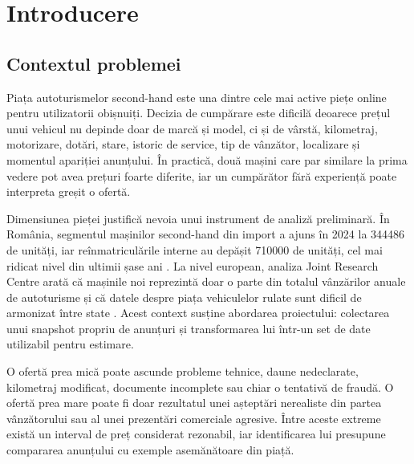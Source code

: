 \chapter{Introducere}
\label{chapter:intro}


\section{Contextul problemei}
\label{sec:intro-context}

Piața autoturismelor second-hand este una dintre cele mai active piețe online pentru utilizatorii obișnuiți. Decizia de cumpărare este dificilă deoarece prețul unui vehicul nu depinde doar de marcă și model, ci și de vârstă, kilometraj, motorizare, dotări, stare, istoric de service, tip de vânzător, localizare și momentul apariției anunțului. În practică, două mașini care par similare la prima vedere pot avea prețuri foarte diferite, iar un cumpărător fără experiență poate interpreta greșit o ofertă.

Dimensiunea pieței justifică nevoia unui instrument de analiză preliminară. În România, segmentul mașinilor second-hand din import a ajuns în 2024 la 344486 de unități, iar reînmatriculările interne au depășit 710000 de unități, cel mai ridicat nivel din ultimii șase ani \cite{revistabiz_auto_2024}. La nivel european, analiza Joint Research Centre arată că mașinile noi reprezintă doar o parte din totalul vânzărilor anuale de autoturisme și că datele despre piața vehiculelor rulate sunt dificil de armonizat între state \cite{jrc_used_vehicle_market}. Acest context susține abordarea proiectului: colectarea unui snapshot propriu de anunțuri și transformarea lui într-un set de date utilizabil pentru estimare.

O ofertă prea mică poate ascunde probleme tehnice, daune nedeclarate, kilometraj modificat, documente incomplete sau chiar o tentativă de fraudă. O ofertă prea mare poate fi doar rezultatul unei așteptări nerealiste din partea vânzătorului sau al unei prezentări comerciale agresive. Între aceste extreme există un interval de preț considerat rezonabil, iar identificarea lui presupune compararea anunțului cu exemple asemănătoare din piață.

